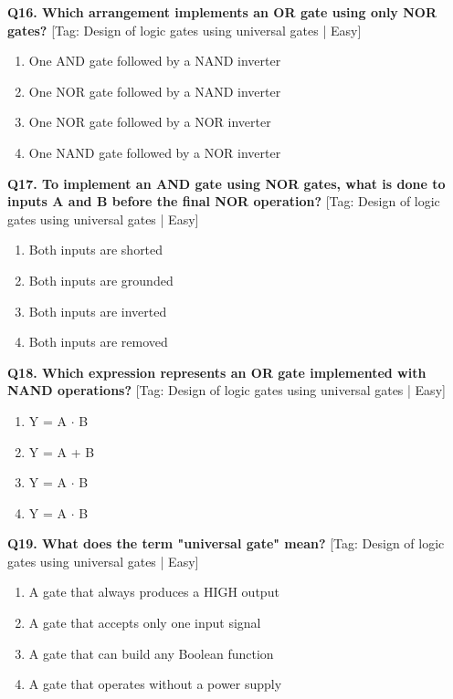 \noindent\textbf{Q16. Which arrangement implements an OR gate using only NOR gates?} \hfill [Tag: Design of logic gates using universal gates | Easy]
\begin{enumerate}[label=(\alph*),topsep=2pt,itemsep=1pt,partopsep=0pt,parsep=0pt]
    \item {One AND gate followed by a NAND inverter}
    \item {One NOR gate followed by a NAND inverter}
    \item {One NOR gate followed by a NOR inverter}
    \item {One NAND gate followed by a NOR inverter}
\end{enumerate}
\vspace{2mm}

\noindent\textbf{Q17. To implement an AND gate using NOR gates, what is done to inputs A and B before the final NOR operation?} \hfill [Tag: Design of logic gates using universal gates | Easy]
\begin{enumerate}[label=(\alph*),topsep=2pt,itemsep=1pt,partopsep=0pt,parsep=0pt]
    \item {Both inputs are shorted}
    \item {Both inputs are grounded}
    \item {Both inputs are inverted}
    \item {Both inputs are removed}
\end{enumerate}
\vspace{2mm}

\noindent\textbf{Q18. Which expression represents an OR gate implemented with NAND operations?} \hfill [Tag: Design of logic gates using universal gates | Easy]
\begin{enumerate}[label=(\alph*),topsep=2pt,itemsep=1pt,partopsep=0pt,parsep=0pt]
    \item {Y = A $\cdot$ B}
    \item {Y = A + B}
    \item {Y = A $\cdot$ B}
    \item {Y = A $\cdot$ B}
\end{enumerate}
\vspace{2mm}

\noindent\textbf{Q19. What does the term "universal gate" mean?} \hfill [Tag: Design of logic gates using universal gates | Easy]
\begin{enumerate}[label=(\alph*),topsep=2pt,itemsep=1pt,partopsep=0pt,parsep=0pt]
    \item {A gate that always produces a HIGH output}
    \item {A gate that accepts only one input signal}
    \item {A gate that can build any Boolean function}
    \item {A gate that operates without a power supply}
\end{enumerate}
\vspace{2mm}

